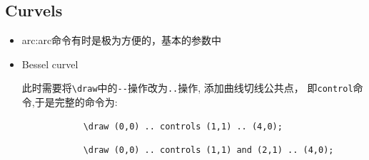 \documentclass[12pt]{article}
\begin{document}
\subsection{Curvels}
\begin{itemize}
    \item arc:arc命令有时是极为方便的，基本的参数中
    \item Bessel curvel\par 
        此时需要将\verb|\draw|中的\verb|--|操作改为\verb|..|操作, 添加曲线切线公共点，
        即\verb|control|命令,于是完整的命令为:
        \begin{verbatim}
            \draw (0,0) .. controls (1,1) .. (4,0);
        \end{verbatim}
        \begin{center}
        \end{center}

        \begin{verbatim}
            \draw (0,0) .. controls (1,1) and (2,1) .. (4,0);
        \end{verbatim}
        \begin{center}
        \end{center}


\end{itemize}
\end{document}
